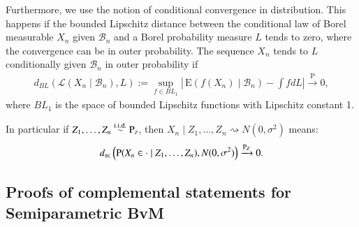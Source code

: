 Furthermore, we use the notion of conditional convergence in distribution. This happens if the bounded Lipschitz distance between the conditional law of Borel measurable $X_n$ given $\mathcal{B}_n$ and a Borel probability measure $L$ tends to zero, where the convergence can be in outer probability. The sequence $X_n$ tends to $L$ conditionally given $\mathcal{B}_n$ in outer probability if
\begin{align}\label{eq: formal definition conditional convergence chapter3}
d_{\scriptscriptstyle{ B L}}\left(\mathcal{L}\left(X_n \mid \mathcal{B}_n\right), L\right) :=\sup _{f \in B L_1}\left| \, \mathrm{E}\left(f\left(X_n\right) \mid \mathcal{B}_n\right)-\int f d L\right| \xrightarrow{\mathrm{P}} 0,
\end{align}
where $ B L_1$ is the space of bounded Lipschitz functions with Lipschitz constant 1.

In particular if $Z_1,\ldots,Z_n \overset{\text{i.i.d.}}{\sim} \mathrm{P}_{\scriptscriptstyle{Z}}$, then $X_n \mid Z_1,\ldots,Z_n \rightsquigarrow N(0,\sigma^2)$ means:
\begin{align}\label{eq: formal definition conditional convergence 1 chapter3}
	d_{\scriptscriptstyle{ B L}}\left( \mathrm{P} (X_n \in \cdot \mid Z_1,\ldots,Z_n), N(0,\sigma^2) \right) \xrightarrow{\mathrm{P}_{\scriptscriptstyle{Z}}} 0.
\end{align}

\subsection{Proofs of complemental statements for Semiparametric BvM}

